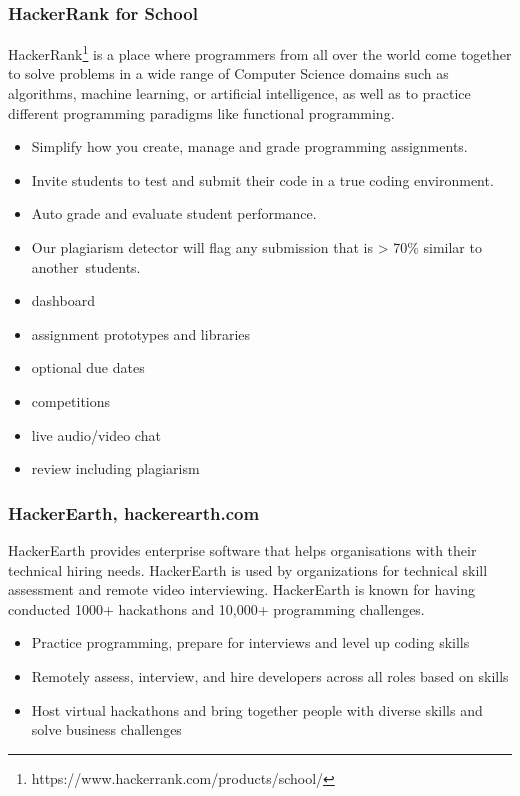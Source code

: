 \subsubsection{HackerRank for School}

{HackerRank\footnote{https://www.hackerrank.com/products/school/} is a place where programmers from all over the world come together to solve problems in a wide range of Computer Science domains such as algorithms, machine learning, or artificial intelligence, as well as to practice different programming paradigms like functional programming.}

\begin{itemize}
\item
  {Simplify how you create, manage and grade programming assignments.}
\item
  {Invite students to test and submit their code in a true coding environment.}
\item
  {Auto grade and evaluate student performance.}
\item
  {Our plagiarism detector will flag any submission that is \textgreater{} 70\% similar to }{another}{~students.}
\item
  {dashboard}
\item
  {assignment prototypes and libraries}
\item
  {optional due dates}
\item
  {competitions}
\item
  {live audio/video chat}
\item
  {review including plagiarism}
\end{itemize}

\subsubsection{HackerEarth, hackerearth.com}

{HackerEarth provides enterprise software that helps organisations with their technical hiring needs. HackerEarth is used by organizations for technical skill assessment and remote video interviewing. HackerEarth is known for having conducted 1000+ hackathons and 10,000+ programming challenges.}

\begin{itemize}
\item
  {Practice programming, prepare for interviews and level up coding skills}
\item
  {Remotely assess, interview, and hire developers across all roles based on skills}
\item
  {Host virtual hackathons and bring together people with diverse skills and solve business challenges}
\end{itemize}

